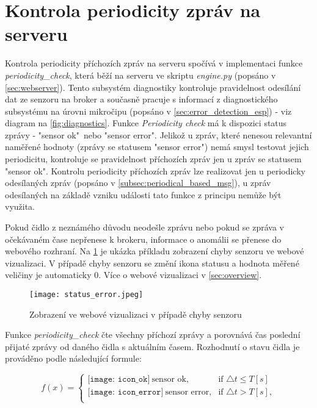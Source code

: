 \section{Kontrola periodicity zpráv na serveru} \label{sec:periodicity_check}
Kontrola periodicity příchozích zpráv na serveru spočívá v implementaci funkce \textit{periodicity\_check}, která běží na serveru ve skriptu \textit{engine.py} (popsáno v \cref{sec:webserver}). Tento subsystém diagnostiky kontroluje pravidelnost odesílání dat ze senzoru na broker a současně pracuje s informací z diagnostického subsystému na úrovni mikročipu (popsáno v \cref{sec:error_detection_esp}) - viz diagram na \cref{fig:diagnostics}. Funkce \textit{Periodicity check} má k dispozici status zprávy - "sensor ok"\ nebo "sensor error". Jelikož u zpráv, které nenesou relevantní naměřené hodnoty (zprávy se statusem "sensor error") nemá smysl testovat jejich periodicitu, kontroluje se pravidelnost příchozích zpráv jen u zpráv se statusem "sensor ok". Kontrolu periodicity příchozích zpráv lze realizovat jen u periodicky odesílaných zpráv (popsáno v \cref{subsec:periodical_based_msg}), u zpráv odesílaných na základě vzniku události tato funkce z principu nemůže být využita. \par 
Pokud čidlo z neznámého důvodu neodešle zprávu nebo pokud se zpráva v očekávaném čase nepřenese k brokeru, informace o anomálii se přenese do webového rozhraní. Na \cref{fig:status_error} je ukázka příkladu zobrazení chyby senzoru ve webové vizualizaci. V případě chyby senzoru se změní ikona statusu a hodnota měřené veličiny je automaticky 0. Více o webové vizualizaci v \cref{sec:overview}.

\begin{figure}[H]
  \centering
  \texttt{[image: status\_error.jpeg]}
  \caption{Zobrazení ve webové vizualizaci v případě chyby senzoru}
  \label{fig:status_error}
\end{figure} 

Funkce \textit{periodicity\_check} čte všechny příchozí zprávy a porovnává čas poslední přijaté zprávy od daného čidla s aktuálním časem. Rozhodnutí o stavu čidla je prováděno podle následující formule: 

\[
    f(x)= 
\begin{cases}
    {\texttt{[image: icon\_ok]}} \ \text{sensor ok}, & \text{if }  \triangle t \leq T [s]\\
    {\texttt{[image: icon\_error]}} \ \text{sensor error}, & \text{if }  \triangle t > T [s],  \\
\end{cases}
\]

